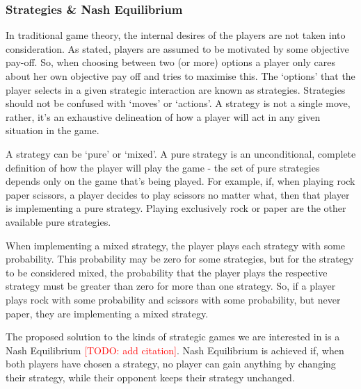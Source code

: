 \documentclass[12pt]{article}
\newcommand{\todo}[1]{\textcolor{red}{[TODO: #1]}\PackageWarning{TODO:}{#1!}}
\newcommand*{\np}{\par\noindent\newline}
\begin{document}
\subsubsection{Strategies \& Nash Equilibrium}
In traditional game theory, the internal desires of the players are  not
taken into consideration. As stated, players are assumed to be motivated by
some objective pay-off. So, when choosing between two (or more) options a
player only cares about her own objective pay off and tries to maximise this.
The `options' that the player selects in a given strategic interaction are
known as strategies. Strategies should not be confused with `moves' or
`actions'. A strategy is not a single move, rather, it's an exhaustive
delineation of how a player will act in any given situation in the game.
\np A strategy can be `pure' or `mixed'. A pure strategy is an unconditional,
complete definition of how the player will play the game - the set of pure
strategies depends only on the game that's being played. For example, if, when
playing rock paper scissors, a player decides to play scissors no matter what,
then that player is implementing a pure strategy. Playing exclusively rock or
paper are the other available pure strategies.
\np When implementing a mixed strategy, the player plays each strategy with
some probability. This probability may be zero for some strategies, but for the
strategy to be considered mixed, the probability that the player plays the
respective strategy must be greater than zero for more than one strategy. So,
if a player plays rock with some probability and scissors with some
probability, but never paper, they are implementing a mixed strategy.
\np The proposed solution to the kinds of strategic games we are interested in
is a Nash Equilibrium \todo{add citation}. Nash Equilibrium is achieved if,
when both players have chosen a strategy, no player can gain anything by
changing their strategy, while their opponent keeps their strategy unchanged. 
\end{document}
